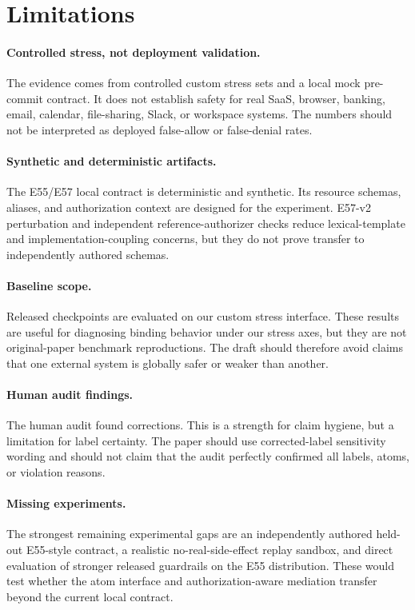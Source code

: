 \section{Limitations}

\paragraph{Controlled stress, not deployment validation.}
The evidence comes from controlled custom stress sets and a local mock pre-commit contract. It does not establish safety for real SaaS, browser, banking, email, calendar, file-sharing, Slack, or workspace systems. The numbers should not be interpreted as deployed false-allow or false-denial rates.

\paragraph{Synthetic and deterministic artifacts.}
The E55/E57 local contract is deterministic and synthetic. Its resource schemas, aliases, and authorization context are designed for the experiment. E57-v2 perturbation and independent reference-authorizer checks reduce lexical-template and implementation-coupling concerns, but they do not prove transfer to independently authored schemas.

\paragraph{Baseline scope.}
Released checkpoints are evaluated on our custom stress interface. These results are useful for diagnosing binding behavior under our stress axes, but they are not original-paper benchmark reproductions. The draft should therefore avoid claims that one external system is globally safer or weaker than another.

\paragraph{Human audit findings.}
The human audit found corrections. This is a strength for claim hygiene, but a limitation for label certainty. The paper should use corrected-label sensitivity wording and should not claim that the audit perfectly confirmed all labels, atoms, or violation reasons.

\paragraph{Missing experiments.}
The strongest remaining experimental gaps are an independently authored held-out E55-style contract, a realistic no-real-side-effect replay sandbox, and direct evaluation of stronger released guardrails on the E55 distribution. These would test whether the atom interface and authorization-aware mediation transfer beyond the current local contract.
